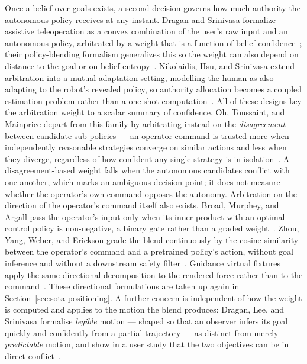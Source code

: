 Once a belief over goals exists, a second decision governs how much authority the autonomous policy receives at any instant. Dragan and Srinivasa formalize assistive teleoperation as a convex combination of the user's raw input and an autonomous policy, arbitrated by a weight that is a function of belief confidence~\cite{dragan2012formalizing}; their policy-blending formalism generalizes this so the weight can also depend on distance to the goal or on belief entropy~\cite{dragan2013policy}. Nikolaidis, Hsu, and Srinivasa extend arbitration into a mutual-adaptation setting, modelling the human as also adapting to the robot's revealed policy, so authority allocation becomes a coupled estimation problem rather than a one-shot computation~\cite{nikolaidis2017mutualadaptation}. All of these designs key the arbitration weight to a scalar summary of confidence. Oh, Toussaint, and Mainprice depart from this family by arbitrating instead on the \emph{disagreement} between candidate sub-policies --- an operator command is trusted more when independently reasonable strategies converge on similar actions and less when they diverge, regardless of how confident any single strategy is in isolation~\cite{oh2021disagreement}. A disagreement-based weight falls when the autonomous candidates conflict with one another, which marks an ambiguous decision point; it does not measure whether the operator's own command opposes the autonomy. Arbitration on the direction of the operator's command itself also exists. Broad, Murphey, and Argall pass the operator's input only when its inner product with an optimal-control policy is non-negative, a binary gate rather than a graded weight~\cite{broad2017learning}. Zhou, Yang, Weber, and Erickson grade the blend continuously by the cosine similarity between the operator's command and a pretrained policy's action, without goal inference and without a downstream safety filter~\cite{zhou2026saps}. Guidance virtual fixtures apply the same directional decomposition to the rendered force rather than to the command~\cite{bettini2004vision,abbott2007haptic}. These directional formulations are taken up again in Section~\ref{sec:sota-positioning}. A further concern is independent of how the weight is computed and applies to the motion the blend produces: Dragan, Lee, and Srinivasa formalise \emph{legible} motion --- shaped so that an observer infers its goal quickly and confidently from a partial trajectory --- as distinct from merely \emph{predictable} motion, and show in a user study that the two objectives can be in direct conflict~\cite{dragan2013legibility}.

